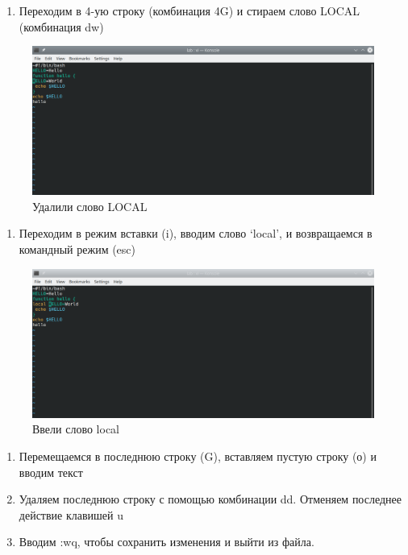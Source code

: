 \documentclass[
  12pt,
  a4paper,
]{scrreprt}
\providecommand{\tightlist}{%
  \setlength{\itemsep}{0pt}\setlength{\parskip}{0pt}}
\begin{document}
\begin{enumerate}
\def\labelenumi{\arabic{enumi}.}
\setcounter{enumi}{2}
\tightlist
\item
  Переходим в 4-ую строку (комбинация 4G) и стираем слово LOCAL
  (комбинация dw)
\end{enumerate}

\begin{figure}
\hypertarget{fig:006}{%
\centering
\includegraphics[width=1\textwidth,height=\textheight]{image/6.png}
\caption{Удалили слово LOCAL}\label{fig:006}
}
\end{figure}

\begin{enumerate}
\def\labelenumi{\arabic{enumi}.}
\setcounter{enumi}{3}
\tightlist
\item
  Переходим в режим вставки (i), вводим слово `local', и возвращаемся в
  командный режим (esc)
\end{enumerate}

\begin{figure}
\hypertarget{fig:007}{%
\centering
\includegraphics[width=1\textwidth,height=\textheight]{image/7.png}
\caption{Ввели слово local}\label{fig:007}
}
\end{figure}

\begin{enumerate}
\def\labelenumi{\arabic{enumi}.}
\setcounter{enumi}{4}
\item
  Перемещаемся в последнюю строку (G), вставляем пустую строку (о) и
  вводим текст
\item
  Удаляем последнюю строку с помощью комбинации dd. Отменяем последнее
  действие клавишей u
\item
  Вводим :wq, чтобы сохранить изменения и выйти из файла.
\end{enumerate}
\end{document}
